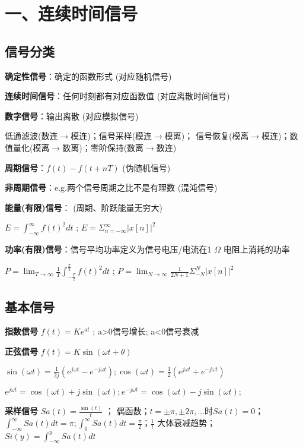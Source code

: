 \setlength{\abovedisplayskip}{0em}
\setlength{\belowdisplayskip}{0em}

\section*{一、连续时间信号}

\subsection*{信号分类}

\textbf{确定性信号}：确定的函数形式 (对应随机信号)

\textbf{连续时间信号}：任何时刻都有对应函数值 (对应离散时间信号)

\textbf{数字信号}：输出离散 (对应模拟信号)

低通滤波(数连$\to$模连)；信号采样(模连$\to$模离)；
信号恢复(模离$\to$模连)；数值量化(模离$\to$数离)；零阶保持(数离$\to$数连)

\textbf{周期信号}：$f(t)-f(t+nT)$ (伪随机信号)

\textbf{非周期信号}：e.g.两个信号周期之比不是有理数 (混沌信号)

\textbf{能量(有限)信号}： (周期、阶跃能量无穷大)

$E= \int ^{\infty} _{-\infty} f(t)^2dt$ ; $E = \Sigma ^{\infty} _{n=-\infty} |x[n]|^2$

\textbf{功率(有限)信号}：信号平均功率定义为信号电压/电流在1 $\Omega$ 电阻上消耗的功率

$P = \lim_{T\to\infty} \frac{1}{T} \int ^{\frac{T}{2}} _{-\frac{T}{2}} f(t)^2dt$ ; $P = \lim_{N\to\infty} \frac{1}{2N + 1} \Sigma ^{N} _{-N} |x[n]|^2$

\subsection*{基本信号}

\textbf{指数信号} $f(t)=Ke^{at}$ ; a>0信号增长; a<0信号衰减

\textbf{正弦信号} $f(t)=K\sin(\omega t + \theta)$

$\sin(\omega t) = \frac{1}{2j}(e^{j \omega t} - e^{-j \omega t}); \cos(\omega t) = \frac{1}{2}(e^{j \omega t} + e^{-j \omega t})$

$e^{j \omega t} = \cos(\omega t) + j\sin(\omega t);e^{-j \omega t} = \cos(\omega t) - j\sin(\omega t);$

\textbf{采样信号} $Sa(t) = \frac{\sin(t)}{t}$ ； 偶函数；$t = \pm \pi, \pm 2 \pi, ...$时$Sa(t)=0$；
$\int ^{\infty} _{-\infty} Sa(t)dt = \pi;\int ^{\infty} _{0} Sa(t)dt = \frac{\pi}{2}$；$\frac{1}{t}$ 大体衰减趋势；$Si(y)=\int^{y}_{-\infty}Sa(t)dt$

